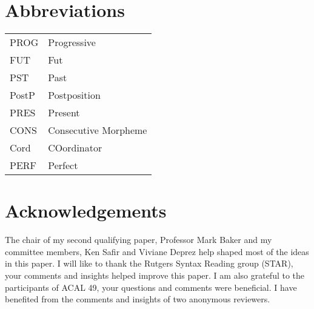 \documentclass[output=paper,colorlinks,citecolor=brown]{langscibook}
\begin{document}
\section*{Abbreviations}


\begin{tabular}{l l} 
PROG  & Progressive \\
FUT   & Fut \\
PST   & Past \\
PostP & Postposition  \\
PRES  & Present  \\
CONS  & Consecutive Morpheme  \\
Cord  & COordinator \\
PERF & Perfect \\
\end{tabular}





\section*{Acknowledgements}
The chair of my second qualifying paper, Professor Mark Baker and my committee members, Ken Safir and Viviane Deprez help shaped most of the ideas in this paper. I will like to thank the Rutgers Syntax Reading group (STAR), your comments and insights helped improve this paper. I am also grateful to the participants of ACAL 49, your questions and comments were beneficial. I have benefited from the comments and insights of two anonymous reviewers.






\printbibliography[heading=subbibliography,notkeyword=this]
\end{document}
